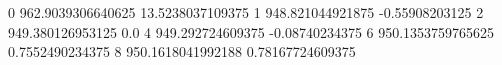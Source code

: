 0 962.9039306640625 13.5238037109375
1 948.821044921875 -0.55908203125
2 949.380126953125 0.0
4 949.292724609375 -0.08740234375
6 950.1353759765625 0.7552490234375
8 950.1618041992188 0.78167724609375
